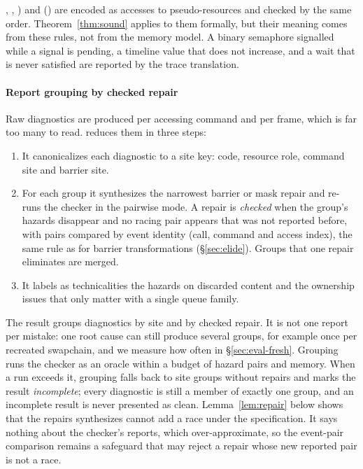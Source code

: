 \begin{sloppypar}
\begin{itemize}
  \allowbreak{}, \allowbreak{},
  \allowbreak{}) and 
  (\allowbreak{}) are encoded as accesses to pseudo-resources and checked by
  the same order. Theorem~\ref{thm:sound} applies to them formally, but their meaning comes from these rules, not
  from the memory model. A binary semaphore signalled while a signal is pending, a timeline value that does not
  increase, and a wait that is never satisfied are reported by the trace translation.
\end{itemize}
\end{sloppypar}

\paragraph{Report grouping by checked repair}
Raw diagnostics are produced per accessing command and per frame, which is far too many to read. \sys reduces them
in three steps:
\begin{enumerate}
\item It canonicalizes each diagnostic to a site key: code, resource role, command site and barrier site.
\item For each group it synthesizes the narrowest barrier or mask repair and re-runs the checker in the pairwise
  mode. A repair is \emph{checked} when the group's hazards disappear and no racing pair appears that was not
  reported before, with pairs compared by event identity (call, command and access index), the same rule as for
  barrier transformations (\S\ref{sec:elide}). Groups that one repair eliminates are merged.
\item It labels as technicalities the hazards on discarded content and the ownership issues that only matter with
  a single queue family.
\end{enumerate}
The result groups diagnostics by site and by checked repair. It is not one report per mistake: one root cause can
still produce several groups, for example once per recreated swapchain, and we measure how often in
\S\ref{sec:eval-fresh}. Grouping runs the checker as an oracle within a budget of hazard pairs and memory. When a run
exceeds it, grouping falls back to site groups without repairs and marks the result \emph{incomplete}; every
diagnostic is still a member of exactly one group, and an incomplete result is never presented as clean. Lemma~\ref{lem:repair} below shows that the repairs \sys synthesizes cannot add a race under
the specification. It says nothing about the checker's reports, which over-approximate, so the event-pair comparison
remains a safeguard that may reject a repair whose new reported pair is not a race.

